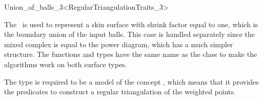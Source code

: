 
\begin{ccRefClass}{Union_of_balls_3<RegularTriangulationTraits_3>}
  \ccDefinition

  The \ccRefName\ is used to represent a skin surface with shrink
  factor equal to one, which is the boundary union of the input balls.
  This case is handled separately since the mixed complex is equal to
  the power diagram, which has a much simpler structure. The functions
  and types have the same name as the  class to
  make the algorithms work on both surface types.

  The type  is required to be a model of the
  concept , which means that it provides the
  predicates to construct a regular triangulation of the weighted
  points.
  




  \ccIsModel {} 

  \ccTypes
  \ccThreeToTwo

  \ccGlue
  \ccGlue
  \ccGlue

  \ccGlue


\end{ccRefClass}
